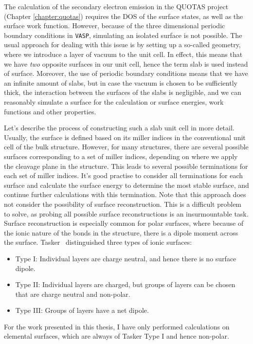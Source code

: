 \begin{refsection}
The calculation of the secondary electron emission in the QUOTAS project (Chapter \ref{chapter:quotas}) requires the DOS of the surface states, as well as the surface work function. However, because of the three dimensional periodic boundary conditions in \texttt{VASP}, simulating an isolated surface is not possible. The usual approach for dealing with this issue is by setting up a so-called  geometry, where we introduce a layer of vacuum to the unit cell. In effect, this means that we have \textit{two} opposite surfaces in our unit cell, hence the term slab is used instead of surface. Moreover, the use of periodic boundary conditions means that we have an infinite amount of slabs, but in case the vacuum is chosen to be sufficiently thick, the interaction between the surfaces of the slabs is negligible, and we can reasonably simulate a surface for the calculation or surface energies, work functions and other properties. 

Let's describe the process of constructing such a slab unit cell in more detail. Usually, the surface is defined based on its miller indices in the conventional unit cell of the bulk structure. However, for many structures, there are several possible surfaces corresponding to a set of miller indices, depending on where we apply the cleavage plane in the structure. This leads to several possible terminations for each set of miller indices. It's good practise to consider all terminations for each surface and calculate the surface energy to determine the most stable surface, and continue further calculations with this termination. Note that this approach does not consider the possibility of surface reconstruction. This is a difficult problem to solve, as probing all possible surface reconstructions is an insurmountable task. Surface reconstruction is especially common for polar surfaces, where because of the ionic nature of the bonds in the structure, there is a dipole moment across the surface. Tasker~\cite{Tasker1979} distinguished three types of ionic surfaces:
\begin{itemize}
\item Type I: Individual layers are charge neutral, and hence there is no surface dipole.
\item Type II: Individual layers are charged, but groups of layers can be chosen that are charge neutral and non-polar.
\item Type III: Groups of layers have a net dipole.
\end{itemize}
For the work presented in this thesis, I have only performed calculations on elemental surfaces, which are always of Tasker Type I and hence non-polar.


\end{refsection}
